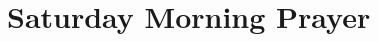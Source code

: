 
\null\medskip{%
\parindent 0pt
\noindent
\ifx\preLilyPondExample \undefined
\else
  \expandafter\preLilyPondExample
\fi
\def\lilypondbook{}%

\ifx\postLilyPondExample \undefined
\else
  \expandafter\postLilyPondExample
\fi
}

\newpage

{%
\parindent 0pt
\noindent
\ifx\preLilyPondExample \undefined
\else
  \expandafter\preLilyPondExample
\fi
\def\lilypondbook{}%

\ifx\postLilyPondExample \undefined
\else
  \expandafter\postLilyPondExample
\fi
}


\null\medskip{%
\parindent 0pt
\noindent
\ifx\preLilyPondExample \undefined
\else
  \expandafter\preLilyPondExample
\fi
\def\lilypondbook{}%

\ifx\postLilyPondExample \undefined
\else
  \expandafter\postLilyPondExample
\fi
}

\newpage
\null\newpage

{%
\parindent 0pt
\noindent
\ifx\preLilyPondExample \undefined
\else
  \expandafter\preLilyPondExample
\fi
\def\lilypondbook{}%

\ifx\postLilyPondExample \undefined
\else
  \expandafter\postLilyPondExample
\fi
}


\null\medskip{%
\parindent 0pt
\noindent
\ifx\preLilyPondExample \undefined
\else
  \expandafter\preLilyPondExample
\fi
\def\lilypondbook{}%

\ifx\postLilyPondExample \undefined
\else
  \expandafter\postLilyPondExample
\fi
}

\newpage


\section{Saturday Morning Prayer}

{%
\parindent 0pt
\noindent
\ifx\preLilyPondExample \undefined
\else
  \expandafter\preLilyPondExample
\fi
\def\lilypondbook{}%

\ifx\postLilyPondExample \undefined
\else
  \expandafter\postLilyPondExample
\fi
}

